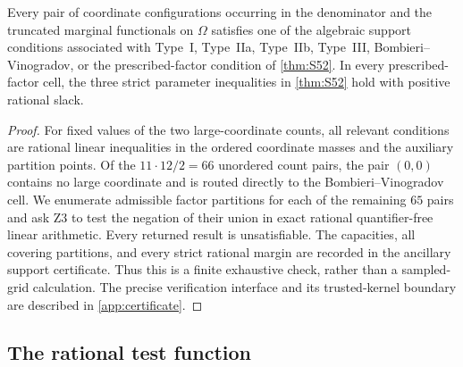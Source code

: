 \begin{proposition}\label{prop:support-routing}
Every pair of coordinate configurations occurring in the denominator and
the truncated marginal functionals on $\Omega$ satisfies one of the algebraic
support conditions associated with Type~I, Type~IIa, Type~IIb, Type~III,
Bombieri--Vinogradov, or the prescribed-factor condition of
\cref{thm:S52}.  In every prescribed-factor cell, the three strict
parameter inequalities in \cref{thm:S52} hold with positive rational
slack.
\end{proposition}

\begin{proof}
For fixed values of the two large-coordinate counts, all relevant
conditions are rational linear inequalities in the ordered coordinate
masses and the auxiliary partition points.  Of the
$11\cdot12/2=66$ unordered count pairs, the pair $(0,0)$ contains no large
coordinate and is routed directly to the Bombieri--Vinogradov cell.  We
enumerate admissible factor partitions for each of the remaining $65$ pairs
and ask Z3 to test the negation of their union in exact rational
quantifier-free linear arithmetic.  Every returned result is unsatisfiable.
The capacities, all covering partitions, and every strict rational margin
are recorded in the ancillary support certificate.  Thus this is a finite
exhaustive check, rather than a sampled-grid calculation.  The precise
verification interface and its trusted-kernel boundary are described in
\cref{app:certificate}.
\end{proof}

\subsection{The rational test function}

